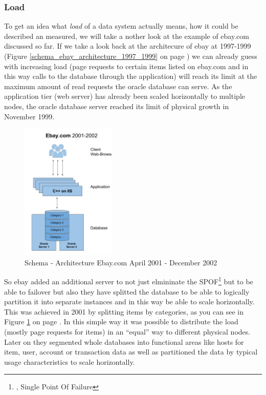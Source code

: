 \subsubsection{Load}
\label{tf_nfreq_scalability_load}
To get an idea what \textit{load} of a data system actually means, how it could be described an measured, we will take a nother look at the example of ebay.com discussed so far. If we take a look back at the architecure of ebay at 1997-1999 (Figure \ref{schema_ebay_architecture_1997_1999} on page \pageref{schema_ebay_architecture_1997_1999}) we can already guess with increasing load (page requests to certain items listed on ebay.com and in this way calls to the database through the application) will reach its limit at the maximum amount of read requests the oracle database can serve. As the application tier (web server) has already been scaled horizontally to multiple nodes, the oracle database server reached its limit of physical growth in November 1999. \\
\begin{figure}[ht]
	\centering
  \includegraphics[width=0.4\textwidth]{Ebay_2002.png}
	\caption{Schema - Architecture Ebay.com April 2001 - December 2002}
	\label{schema_ebay_2002}
\end{figure}

So ebay added an additional server to not just elmininate the SPOF\footnote{\cite{WPSPOF}, Single Point Of Failure} but to be able to failover but also they have splitted the database to be able to logically partition it into separate instances and in this way be able to scale horizontally. This was achieved in 2001 by splitting items by categories, as you can see in Figure \ref{schema_ebay_2002} on page \pageref{schema_ebay_2002}. In this simple way it was possible to distribute the load (mostly page requests for items) in an ``equal'' way to different physical nodes.
Later on they segmented whole databases into functional areas like hosts for item, user, account or transaction data as well as partitioned the data by typical usage characteristics to scale horizontally.\\

